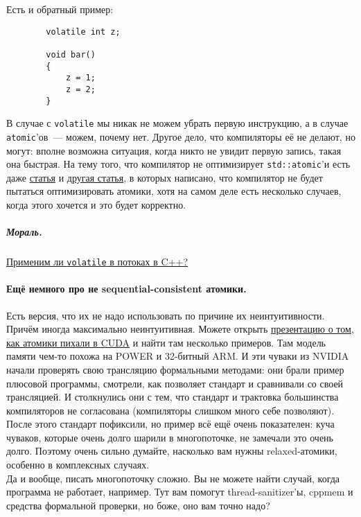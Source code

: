 \documentclass{article}
\begin{document}
    Есть и обратный пример:
    \begin{verbatim}
        volatile int z;

        void bar()
        {
            z = 1;
            z = 2;
        }
    \end{verbatim}
    В случае с \texttt{volatile} мы никак не можем убрать первую инструкцию, а в случае \Verb|atomic|'ов~--- можем, почему нет. Другое дело, что компиляторы её не делают, но могут: вполне возможна ситуация, когда никто не увидит первую запись, такая она быстрая. На тему того, что компилятор не оптимизирует \texttt{std::atomic}'и есть даже \href{https://wg21.link/n4455}{статья} и \href{https://wg21.link/p0062}{другая статья}, в которых написано, что компилятор не будет пытаться оптимизировать атомики, хотя на самом деле есть несколько случаев, когда этого хочется и это будет корректно.
    \subparagraph{Мораль.}
    \href{https://isvolatileusefulwiththreads.in/cxx/}{Применим ли \texttt{volatile} в потоках в C++?}
    \paragraph{Ещё немного про не sequential-consistent атомики.}
    Есть версия, что их не надо использовать по причине их неинтуитивности. Причём иногда максимально неинтуитивная. Можете открыть \href{https://youtu.be/VogqOscJYvk?t=3212}{презентацию о том, как атомики пихали в CUDA} и найти там несколько примеров. Там модель памяти чем-то похожа на POWER и 32-битный ARM. И эти чуваки из NVIDIA начали проверять свою трансляцию формальными методами: они брали пример плюсовой программы, смотрели, как позволяет стандарт и сравнивали со своей трансляцией. И столкнулись они с тем, что стандарт и трактовка большинства компиляторов не согласована (компиляторы слишком много себе позволяют). После этого стандарт пофиксили, но пример всё ещё очень показателен: куча чуваков, которые очень долго шарили в многопоточке, не замечали это очень долго. Поэтому очень сильно думайте, насколько вам нужны relaxed-атомики, особенно в комплексных случаях.\\
    Да и вообще, писать многопоточку сложно. Вы не можете найти случай, когда программа не работает, например. Тут вам помогут thread-sanitizer'ы, cppmem и средства формальной проверки, но боже, оно вам точно надо?
\end{document}
